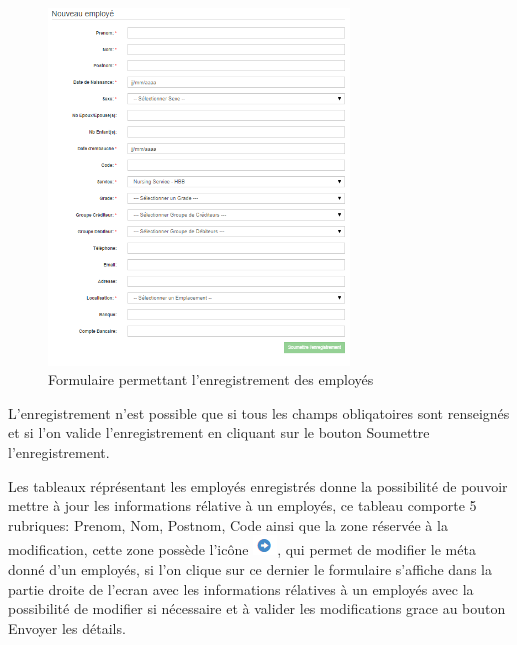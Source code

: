 \documentclass[12pt,a4paper]{report}
\begin{document}
\begin{figure}[h]
\begin{center}
\includegraphics[width=8cm]{pic/FormNewEmp.png}
\end{center}
\caption{Formulaire permettant l'enregistrement des employés}
\label{Formulaire permettant l'enregistrement des employés}
\end{figure} 
\newpage
L'enregistrement n'est possible que si tous les champs obliqatoires sont renseignés et si l'on valide l'enregistrement en cliquant sur le bouton Soumettre l'enregistrement. 

Les tableaux réprésentant les employés enregistrés donne la possibilité de pouvoir mettre à jour les informations rélative à un employés, ce tableau comporte 5 rubriques: Prenom, Nom, Postnom, Code ainsi que la zone réservée à la modification, cette zone possède l'icône \includegraphics[scale=0.7]{pic/PlusUpdate.png}, qui permet de modifier le méta donné d'un employés, si l'on clique sur ce dernier le formulaire s'affiche dans la partie droite de l'ecran avec les informations rélatives à un employés avec la possibilité de modifier si nécessaire et à valider les modifications grace au bouton Envoyer les détails.
\end{document}
